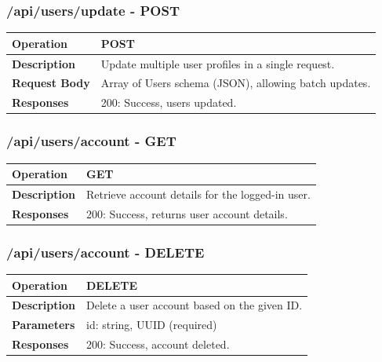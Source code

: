 \subsubsection*{/api/users/update - POST}
\begin{tabular}{|>{\raggedright\arraybackslash}p{3cm}|p{12cm}|}
\hline
\textbf{Operation} & POST \\
\hline
\textbf{Description} & Update multiple user profiles in a single request. \\
\hline
\textbf{Request Body} & Array of Users schema (JSON), allowing batch updates. \\
\hline
\textbf{Responses} & 200: Success, users updated. \\
\hline
\end{tabular}

\subsubsection*{/api/users/account - GET}
\begin{tabular}{|>{\raggedright\arraybackslash}p{3cm}|p{12cm}|}
\hline
\textbf{Operation} & GET \\
\hline
\textbf{Description} & Retrieve account details for the logged-in user. \\
\hline
\textbf{Responses} & 200: Success, returns user account details. \\
\hline
\end{tabular}

\subsubsection*{/api/users/account - DELETE}
\begin{tabular}{|>{\raggedright\arraybackslash}p{3cm}|p{12cm}|}
\hline
\textbf{Operation} & DELETE \\
\hline
\textbf{Description} & Delete a user account based on the given ID. \\
\hline
\textbf{Parameters} & id: string, UUID (required) \\
\hline
\textbf{Responses} & 200: Success, account deleted. \\
\hline
\end{tabular}


